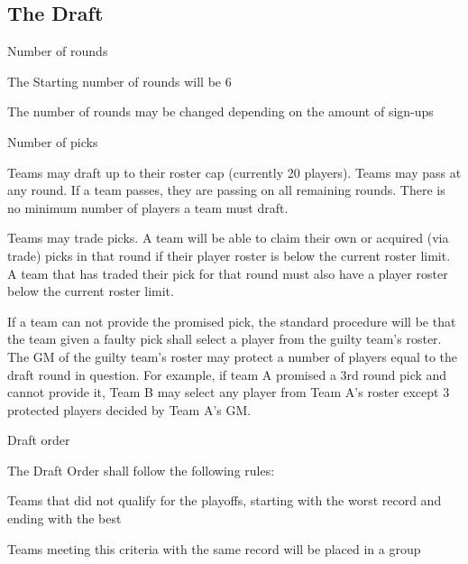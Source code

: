 \subsection{The Draft}
\begin{deepEnumerate}
	\item Number of rounds
	\begin{deepEnumerate}
		\item The Starting number of rounds will be 6
		\item The number of rounds may be changed depending on the amount of sign-ups
	\end{deepEnumerate}
	\item Number of picks
	\begin{deepEnumerate}
		\item Teams may draft up to their roster cap (currently 20 players). Teams may pass at any round.
		If a team passes, they are passing on all remaining rounds. There is no minimum number of players a team must draft.
		\item Teams may trade picks. A team will be able to claim their own or acquired (via trade) picks in that round if their player roster is below the current roster limit.
		A team that has traded their pick for that round must also have a player roster below the current roster limit.
		\begin{deepEnumerate}
			\item  If a team can not provide the promised pick, the standard procedure will be that
			the team given a faulty pick shall select a player from the guilty team's roster. The GM of the guilty
			team's roster may protect a number of players equal to the draft round in question. For example, if
 			team A promised a 3rd round pick and cannot provide it, Team B may select any player from Team A's
 			roster except 3 protected players decided by Team A's GM.
		\end{deepEnumerate}
	\end{deepEnumerate}
	\item Draft order
	\label{sec:Draft order}
	\begin{deepEnumerate}
		\item The Draft Order shall follow the following rules:
		\begin{deepEnumerate}
			\item Teams that did not qualify for the playoffs, starting with the worst record and ending with the best
			\begin{deepEnumerate}
				\item Teams meeting this criteria with the same record will be placed in a group

\end{deepEnumerate}
\end{deepEnumerate}
\end{deepEnumerate}
\end{deepEnumerate}
